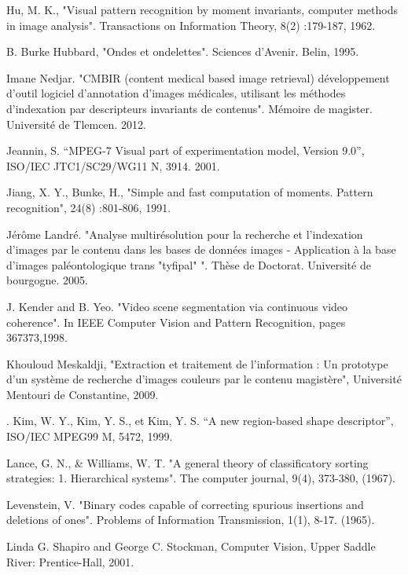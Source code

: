\documentclass[
openany,
11pt, %
french, %
singlespacing, %
headsepline, %
]{MastersDoctoralThesis} %
\begin{document}
\begin{thebibliography}{widest entry}
	 Hu, M. K., "Visual pattern recognition by moment invariants, computer methods in image analysis". Transactions on Information Theory, 8(2) :179-187, 1962.
	
	 B. Burke Hubbard, "Ondes et ondelettes". Sciences d'Avenir. Belin, 1995.
	
	
	 Imane Nedjar. "CMBIR (content medical based image retrieval)
	développement d’outil logiciel d’annotation d’images médicales, utilisant les
	méthodes d’indexation par descripteurs invariants de contenus". Mémoire de
	magister. Université de Tlemcen. 2012.
	
	  Jeannin, S. “MPEG-7 Visual part of experimentation model, Version 9.0”, ISO/IEC JTC1/SC29/WG11 N, 3914. 2001.
	
	  Jiang, X. Y.,  Bunke, H., "Simple and fast computation of moments. Pattern recognition", 24(8) :801-806, 1991.
	
	 Jérôme Landré. "Analyse multirésolution pour la recherche et
	l’indexation d’images par le contenu dans les bases de données images -
	Application à la base d’images paléontologique trans "tyfipal" ". Thèse de
	Doctorat. Université de bourgogne. 2005.
	
	
	 J. Kender and B. Yeo. "Video scene segmentation via continuous video coherence". In IEEE Computer Vision and Pattern Recognition, pages 367373,1998.
	
	
	 Khouloud Meskaldji, "Extraction et traitement de l’information : Un prototype d’un système de recherche d’images couleurs par le contenu magistère", Université Mentouri de Constantine, 2009.
	
	. Kim, W. Y., Kim, Y. S., et Kim, Y. S. “A new region-based shape descriptor”, ISO/IEC MPEG99 M, 5472, 1999.
	
	 Lance, G. N., \& Williams, W. T. "A general theory of classificatory sorting strategies: 1. Hierarchical systems". The computer journal, 9(4), 373-380, (1967).
	
	 Levenstein, V. "Binary codes capable of correcting spurious insertions and deletions of ones". Problems of Information Transmission, 1(1), 8-17. (1965).
	
	 Linda G. Shapiro and George C. Stockman, Computer Vision, Upper Saddle River: Prentice-Hall, 2001.
	

\end{thebibliography}
\end{document}
